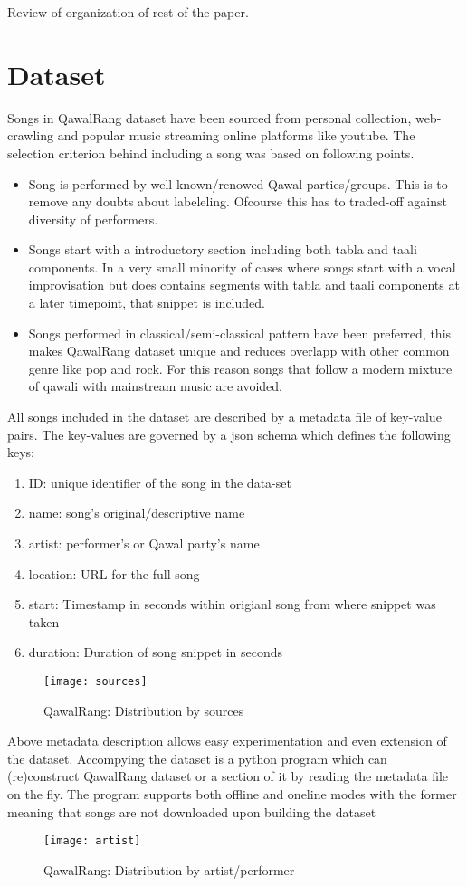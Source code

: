 \documentclass{article}
\begin{document}
Review of organization of rest of the paper.

\section{Dataset}\label{sec:data}
Songs in QawalRang dataset have been sourced from personal collection, web-crawling and popular music streaming online platforms like youtube. The selection criterion behind including a song was based on following points.
\begin{itemize}
\item Song is performed by well-known/renowed Qawal parties/groups. This is to remove any doubts about labeleling. Ofcourse this has to traded-off against diversity of performers.
\item Songs start with a introductory section including both tabla and taali components. In a very small minority of cases where songs start with a vocal improvisation but does contains segments with tabla and taali components at a later timepoint, that snippet is included.
\item Songs performed in classical/semi-classical pattern have been preferred, this makes QawalRang dataset unique and reduces overlapp with other common genre like pop and rock. For this reason songs that follow a modern mixture of qawali with mainstream music are avoided.
\end{itemize}

All songs included in the dataset are described by a metadata file of key-value pairs. The key-values are governed by a json schema which defines the following keys:
\begin{enumerate}
\item ID: unique identifier of the song in the data-set
\item name: song's original/descriptive name
\item artist: performer's or Qawal party's name
\item location: URL for the full song
\item start: Timestamp in seconds within origianl song from where snippet was taken
\item duration: Duration of song snippet in seconds
\end{enumerate}

\begin{figure}[htbp]
  \centering
  \texttt{[image: sources]}
  \caption{QawalRang: Distribution by sources}
\label{fig:src_dist}
\end{figure}
Above metadata description allows easy experimentation and even extension of the dataset. Accompying the dataset is a python program which can (re)construct QawalRang dataset or a section of it by reading the metadata file on the fly. The program supports both offline and oneline modes with the former meaning that songs are not downloaded upon building the dataset
\begin{figure}[htbp]
  \centering
  \texttt{[image: artist]}
  \caption{QawalRang: Distribution by artist/performer}
\label{fig:author_dist}
\end{figure}
\end{document}
